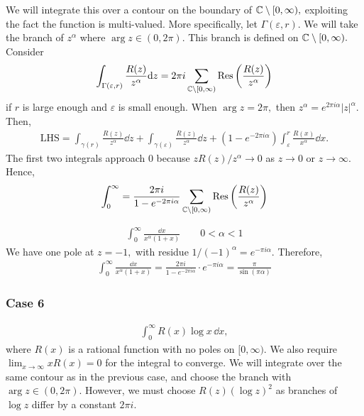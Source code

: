 \documentclass[a4paper,12pt]{article}
\begin{document}
We will integrate this over a contour on the boundary of $\mathbb{C}\setminus[0,\infty),$ exploiting the fact the function is multi-valued. More specifically, let $\Gamma(\varepsilon, r).$ We will take the branch of $z^\alpha$ where $\arg z\in(0,2\pi).$ This branch is defined on $\mathbb{C}\setminus[0,\infty).$ Consider \begin{align}
    \int_{\Gamma(\varepsilon,r)}\frac{R(z)}{z^\alpha}\dd z=2\pi i\sum_{\mathbb{C}\setminus[0,\infty)}\mathrm{Res}\left(\frac{R(z)}{z^\alpha}\right)
\end{align}
if $r$ is large enough and $\varepsilon$ is small enough. When $\arg z=2\pi,$ then $z^\alpha=e^{2\pi i\alpha}|z|^\alpha.$ Then, \begin{align}
    \text{LHS}=\int_{\gamma(r)}\frac{R(z)}{z^\alpha}\dd z+\int_{\gamma(\varepsilon)}\frac{R(z)}{z^\alpha}\dd z+(1-e^{-2\pi i\alpha})\int_\varepsilon^r\frac{R(x)}{x^\alpha}\dd x.
\end{align}
The first two integrals approach $0$ because $zR(z)/z^{\alpha}\to 0$ as $z\to 0$ or $z\to\infty.$ Hence, \begin{align}
    \int_0^\infty=\frac{2\pi i}{1-e^{-2\pi i\alpha}}\sum_{\mathbb{C}\setminus[0,\infty)}\mathrm{Res}\left(\frac{R(z)}{z^\alpha}\right)
\end{align}
\begin{example}
    \begin{align}
        \int_0^\infty\frac{\dd x}{x^\alpha(1+x)}\qquad 0<\alpha<1
    \end{align}
    We have one pole at $z=-1,$ with residue $1/(-1)^\alpha=e^{-\pi i\alpha}.$ Therefore, \begin{align}
        \int_0^\infty\frac{\dd x}{x^\alpha(1+x)}=\frac{2\pi i}{1-e^{-2\pi i\alpha}}\cdot e^{-\pi i\alpha}=\frac{\pi}{\sin(\pi\alpha)}
    \end{align}
\end{example}
\subsubsection{Case 6}
\begin{align}
    \int_0^\infty R(x)\log x\,\dd x,
\end{align}
where $R(x)$ is a rational function with no poles on $[0,\infty).$ We also require $\lim_{x\to\infty}xR(x)=0$ for the integral to converge. We will integrate over the same contour as in the previous case, and choose the branch with $\arg z\in(0,2\pi).$ However, we must choose $R(z)(\log z)^2$ as branches of $\log z$ differ by a constant $2\pi i.$  
\end{document}

